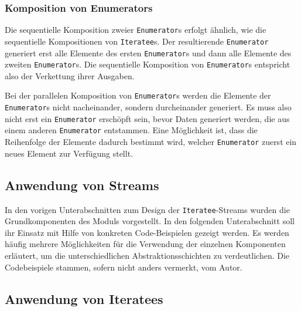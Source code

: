 
\subsubsection{Komposition von Enumerators} %
\label{ssub:komposition_von_enumerators}

Die sequentielle Komposition zweier \lstinline|Enumerator|s erfolgt ähnlich, wie die sequentielle Kompositionen von \lstinline|Iteratee|s.
Der resultierende \lstinline|Enumerator| generiert erst alle Elemente des ersten \lstinline|Enumerator|s und dann alle Elemente des zweiten \lstinline|Enumerator|s.
Die sequentielle Komposition von \lstinline|Enumerator|s entspricht also der Verkettung ihrer Ausgaben. %

Bei der parallelen Komposition von \lstinline|Enumerator|s werden die Elemente der \lstinline|Enumerator|s nicht nacheinander, sondern durcheinander generiert.
Es muss also nicht erst ein \lstinline|Enumerator| erschöpft sein, bevor Daten generiert werden, die aus einem anderen \lstinline|Enumerator| entstammen.
Eine Möglichkeit ist, dass die Reihenfolge der Elemente dadurch bestimmt wird, welcher \lstinline|Enumerator| zuerst ein neues Element zur Verfügung stellt. %




\subsection{Anwendung von Streams} %
\label{sub:anwendung}

In den vorigen Unterabschnitten zum Design der \lstinline|Iteratee|-Streams wurden die Grundkomponenten des Moduls vorgestellt.
In den folgenden Unterabschnitt soll ihr Einsatz mit Hilfe von konkreten Code-Beispielen gezeigt werden.
Es werden häufig mehrere Möglichkeiten für die Verwendung der einzelnen Komponenten erläutert, um die unterschiedlichen Abstraktionsschichten zu verdeutlichen.
Die Codebeispiele stammen, sofern nicht anders vermerkt, vom Autor.



\subsection{Anwendung von Iteratees} %
\label{sub:iteratees}

